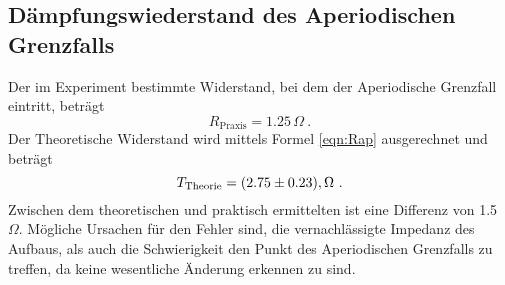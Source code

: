 \subsection{Dämpfungswiederstand des Aperiodischen Grenzfalls}
Der im Experiment bestimmte Widerstand, bei dem der Aperiodische Grenzfall eintritt, beträgt
\begin{equation}
  R_\text{Praxis} = 1.25 \, \Omega \ .
  \label{eqn:Rprax}
\end{equation}
Der Theoretische Widerstand wird mittels Formel \ref{eqn:Rap} ausgerechnet und beträgt 
\begin{equation}
  T_\text{Theorie} = (\num{2.75 +- 0.23}) , \Omega \ .
  \label{eqn:Rthe}
\end{equation}
Zwischen dem theoretischen und praktisch ermittelten ist eine Differenz von 1.5 $\Omega$. Mögliche Ursachen für den Fehler sind, die vernachlässigte Impedanz des Aufbaus, als auch die Schwierigkeit den Punkt des Aperiodischen Grenzfalls zu treffen, da keine wesentliche Änderung erkennen zu sind. 
